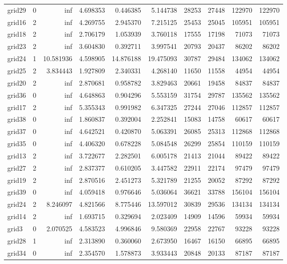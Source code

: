 \begin{longtable}{|l|r|r|r|r|r|r|r|r|r|}
grid29 & 0 & inf & 4.698353 & 0.446385 & 5.144738 & 28253 & 27448 & 122970 & 122970 \\
grid16 & 2 & inf & 4.269755 & 2.945370 & 7.215125 & 25453 & 25045 & 105951 & 105951 \\
grid18 & 2 & inf & 2.706179 & 1.053939 & 3.760118 & 17555 & 17198 & 71073 & 71073 \\
grid23 & 2 & inf & 3.604830 & 0.392711 & 3.997541 & 20793 & 20437 & 86202 & 86202 \\
grid24 & 1 & 10.581936 & 4.598905 & 14.876188 & 19.475093 & 30787 & 29484 & 134062 & 134062 \\
grid25 & 2 & 3.834443 & 1.927809 & 2.340331 & 4.268140 & 11650 & 11558 & 44954 & 44954 \\
grid20 & 2 & inf & 2.870681 & 0.958782 & 3.829463 & 20661 & 19458 & 84837 & 84837 \\
grid36 & 0 & inf & 4.648863 & 0.904296 & 5.553159 & 31754 & 29787 & 135562 & 135562 \\
grid17 & 2 & inf & 5.355343 & 0.991982 & 6.347325 & 27244 & 27046 & 112857 & 112857 \\
grid38 & 0 & inf & 1.860837 & 0.392004 & 2.252841 & 15083 & 14758 & 60617 & 60617 \\
grid37 & 0 & inf & 4.642521 & 0.420870 & 5.063391 & 26085 & 25313 & 112868 & 112868 \\
grid35 & 0 & inf & 4.406320 & 0.678228 & 5.084548 & 26299 & 25854 & 110159 & 110159 \\
grid13 & 2 & inf & 3.722677 & 2.282501 & 6.005178 & 21413 & 21044 & 89422 & 89422 \\
grid27 & 2 & inf & 2.837377 & 0.610205 & 3.447582 & 22911 & 22174 & 97479 & 97479 \\
grid19 & 2 & inf & 2.870516 & 2.451273 & 5.321789 & 21255 & 20052 & 87292 & 87292 \\
grid39 & 0 & inf & 4.059418 & 0.976646 & 5.036064 & 36621 & 33788 & 156104 & 156104 \\
grid24 & 2 & 8.246097 & 4.821566 & 8.775446 & 13.597012 & 30839 & 29536 & 134134 & 134134 \\
grid14 & 2 & inf & 1.693715 & 0.329694 & 2.023409 & 14909 & 14596 & 59934 & 59934 \\
grid3 & 0 & 2.070525 & 4.583523 & 4.996846 & 9.580369 & 22958 & 22767 & 93228 & 93228 \\
grid28 & 1 & inf & 2.313890 & 0.360060 & 2.673950 & 16467 & 16150 & 66895 & 66895 \\
grid34 & 0 & inf & 2.354570 & 1.578873 & 3.933443 & 20848 & 20133 & 87187 & 87187 \\

\end{longtable}
